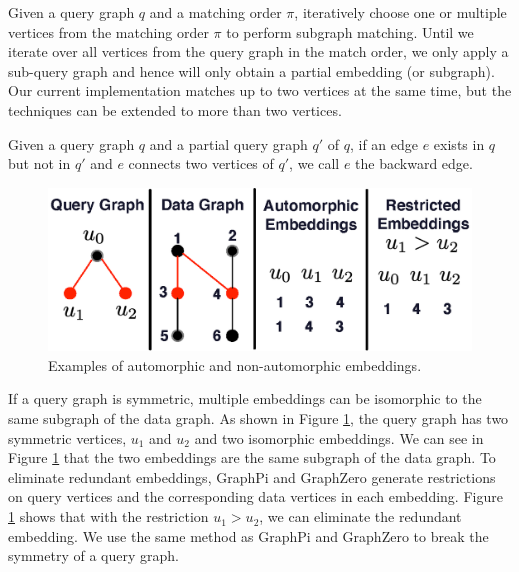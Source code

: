  Given a query graph $q$ and a matching order $\pi$, \SystemName iteratively choose one or multiple vertices
from the matching order $\pi$ to perform subgraph matching. Until we iterate over all vertices from the query graph in the match order, we
only apply a sub-query graph and hence will only obtain a partial embedding (or subgraph). Our current implementation matches up to two
vertices at the same time, but the techniques can be extended to more than two vertices.


 Given a query graph $q$ and a partial query graph $q'$ of $q$, if an edge $e$ exists in $q$ but not in $q'$ and
$e$ connects two vertices of $q'$, we call $e$ the backward edge.

\begin{figure}
\centering
\includegraphics[width=\columnwidth]{./figure/automorphism.eps}
\caption{Examples of automorphic and non-automorphic embeddings.}	
\label{fig:automo}
\end{figure}

If a query graph is symmetric, multiple embeddings can be isomorphic to the same subgraph of the data graph. As shown in Figure
\ref{fig:automo}, the query graph has two symmetric vertices, $u_1$ and $u_2$ and two isomorphic embeddings. We can see in Figure
\ref{fig:automo} that the two embeddings are the same subgraph of the data graph. To eliminate redundant embeddings, GraphPi
\cite{shi2020graphpi} and GraphZero \cite{mawhirter2019graphzero} generate restrictions on query vertices and the corresponding data
vertices in each embedding. Figure \ref{fig:automo} shows that with the restriction $u_1 > u_2$, we can eliminate the redundant embedding.
We use the same method as GraphPi and GraphZero to break the symmetry of a query graph.

